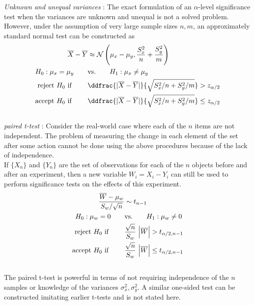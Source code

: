 \textit{Unknown and unequal variances} : The exact formulation of an $ \alpha $-level significance test when the variances are unknown and unequal is not a solved problem. However, under the assumption of very large sample sizes $ n, m $, an approximately standard normal test can be constructed as\\

\begin{align}
	\overline{X} - \overline{Y} &\approx \mathcal{N}\left( \mu_x - \mu_y, \frac{S_x^2}{n} + \frac{S_y^2}{m} \right) \nonumber \\
	H_0 : \mu_x = \mu_y \qquad &\text{vs.} \qquad H_1 : \mu_x \neq \mu_y \nonumber \\
	\text{reject $ H_0 $ if } \qquad & \ddfrac{| \overline{X} - \overline{Y} |}{\sqrt{S_x^2/n + S_y^2/m}} > z_{\alpha/2} \nonumber \\
	\text{accept $ H_0 $ if } \qquad & \ddfrac{| \overline{X} - \overline{Y} |}{\sqrt{S_x^2/n + S_y^2/m}} \leq z_{\alpha/2}
\end{align}\\

\textit{paired t-test} : Consider the real-world case where each of the $ n $ items are not independent. The problem of measuring the change in each element of the set after some action cannot be done using the above procedures because of the lack of independence.\\

If $ \{X_n\} $ and $ \{Y_n\} $ are the set of observations for each of the $ n $ objects before and after an experiment, then a new variable $ W_i = X_i - Y_i $ can still be used to perform significance tests on the effects of this experiment. \\

\begin{align}
	\frac{\overline{W} - \mu_w}{S_w / \sqrt{n}} &\sim t_{n-1} \nonumber \\
	H_0 : \mu_w = 0 \qquad &\text{vs.} \qquad H_1 : \mu_w \neq 0 \nonumber \\
	\text{reject $ H_0 $ if } \qquad & \frac{\sqrt{n}}{S_w}\ \Big| \overline{W} \Big| > t_{\alpha/2, n-1} \nonumber \\
	\text{accept $ H_0 $ if } \qquad & \frac{\sqrt{n}}{S_w}\ \Big| \overline{W} \Big| \leq t_{\alpha/2, n-1}
\end{align} \\

The paired t-test is powerful in terms of not requiring independence of the $ n $ samples or knowledge of the variances $ \sigma_x^2, \sigma_y^2 $. A similar one-sided test can be constructed imitating earlier t-tests and is not stated here.\\

